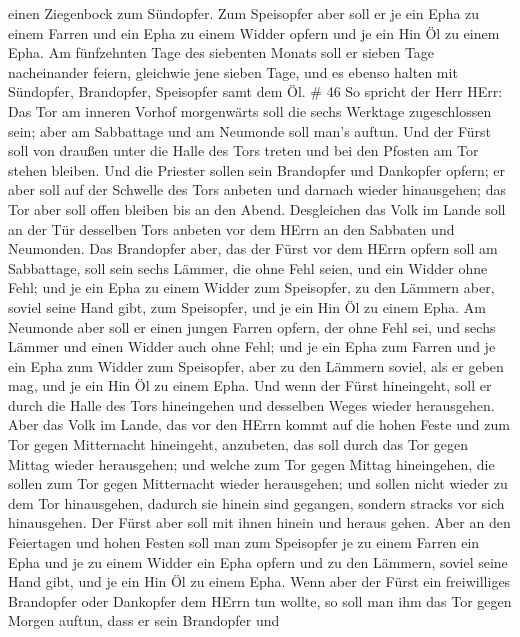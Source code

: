 einen Ziegenbock zum Sündopfer.  Zum Speisopfer aber soll
er je ein Epha zu einem Farren und ein Epha zu einem Widder opfern und
je ein Hin Öl zu einem Epha.  Am fünfzehnten Tage des
siebenten Monats soll er sieben Tage nacheinander feiern, gleichwie jene
sieben Tage, und es ebenso halten mit Sündopfer, Brandopfer, Speisopfer
samt dem Öl. \# 46  So spricht der Herr HErr: Das Tor am
inneren Vorhof morgenwärts soll die sechs Werktage zugeschlossen sein;
aber am Sabbattage und am Neumonde soll man's auftun.  Und
der Fürst soll von draußen unter die Halle des Tors treten und bei den
Pfosten am Tor stehen bleiben. Und die Priester sollen sein Brandopfer
und Dankopfer opfern; er aber soll auf der Schwelle des Tors anbeten und
darnach wieder hinausgehen; das Tor aber soll offen bleiben bis an den
Abend.  Desgleichen das Volk im Lande soll an der Tür
desselben Tors anbeten vor dem HErrn an den Sabbaten und Neumonden.
 Das Brandopfer aber, das der Fürst vor dem HErrn opfern
soll am Sabbattage, soll sein sechs Lämmer, die ohne Fehl seien, und ein
Widder ohne Fehl;  und je ein Epha zu einem Widder zum
Speisopfer, zu den Lämmern aber, soviel seine Hand gibt, zum Speisopfer,
und je ein Hin Öl zu einem Epha.  Am Neumonde aber soll er
einen jungen Farren opfern, der ohne Fehl sei, und sechs Lämmer und
einen Widder auch ohne Fehl;  und je ein Epha zum Farren und
je ein Epha zum Widder zum Speisopfer, aber zu den Lämmern soviel, als
er geben mag, und je ein Hin Öl zu einem Epha.  Und wenn der
Fürst hineingeht, soll er durch die Halle des Tors hineingehen und
desselben Weges wieder herausgehen.  Aber das Volk im Lande,
das vor den HErrn kommt auf die hohen Feste und zum Tor gegen
Mitternacht hineingeht, anzubeten, das soll durch das Tor gegen Mittag
wieder herausgehen; und welche zum Tor gegen Mittag hineingehen, die
sollen zum Tor gegen Mitternacht wieder herausgehen; und sollen nicht
wieder zu dem Tor hinausgehen, dadurch sie hinein sind gegangen, sondern
stracks vor sich hinausgehen.  Der Fürst aber soll mit
ihnen hinein und heraus gehen.  Aber an den Feiertagen und
hohen Festen soll man zum Speisopfer je zu einem Farren ein Epha und je
zu einem Widder ein Epha opfern und zu den Lämmern, soviel seine Hand
gibt, und je ein Hin Öl zu einem Epha.  Wenn aber der Fürst
ein freiwilliges Brandopfer oder Dankopfer dem HErrn tun wollte, so soll
man ihm das Tor gegen Morgen auftun, dass er sein Brandopfer und
